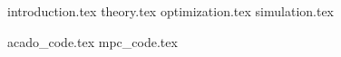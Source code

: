 \documentclass[]{report}
\numberwithin{equation}{chapter}
\begin{document}

\setcounter{page}{1}

\tableofcontents
\newpage

\listoffigures									
{}
\clearpage

\setcounter{page}{1}
\pagestyle{fancy}

{introduction.tex}
{theory.tex}
{optimization.tex}
{simulation.tex}


\begin{appendices}
{acado_code.tex}
{mpc_code.tex}
\end{appendices}


\newpage


{}
\end{document}
